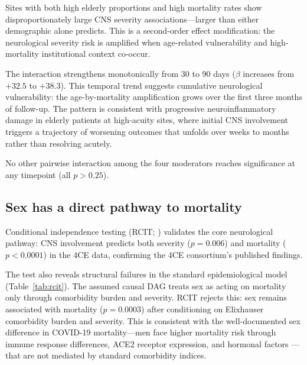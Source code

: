 \documentclass{article}
\begin{document}
Sites with both high elderly proportions and high mortality rates show disproportionately large CNS severity associations---larger than either demographic alone predicts. This is a second-order effect modification: the neurological severity risk is amplified when age-related vulnerability and high-mortality institutional context co-occur.

The interaction strengthens monotonically from 30 to 90 days ($\beta$ increases from $+32.5$ to $+38.3$). This temporal trend suggests cumulative neurological vulnerability: the age-by-mortality amplification grows over the first three months of follow-up. The pattern is consistent with progressive neuroinflammatory damage in elderly patients at high-acuity sites, where initial CNS involvement triggers a trajectory of worsening outcomes that unfolds over weeks to months rather than resolving acutely.

No other pairwise interaction among the four moderators reaches significance at any timepoint (all $p > 0.25$).


\subsection{Sex has a direct pathway to mortality}

Conditional independence testing (RCIT; \citealt{strobl2019rcit}) validates the core neurological pathway: CNS involvement predicts both severity ($p = 0.006$) and mortality ($p < 0.0001$) in the 4CE data, confirming the 4CE consortium's published findings.

The test also reveals structural failures in the standard epidemiological model (Table~\ref{tab:rcit}). The assumed causal DAG treats sex as acting on mortality only through comorbidity burden and severity. RCIT rejects this: sex remains associated with mortality ($p = 0.0003$) after conditioning on Elixhauser comorbidity burden and severity. This is consistent with the well-documented sex difference in COVID-19 mortality---men face higher mortality risk through immune response differences, ACE2 receptor expression, and hormonal factors \cite{takahashi2020sex}---that are not mediated by standard comorbidity indices.
\end{document}

